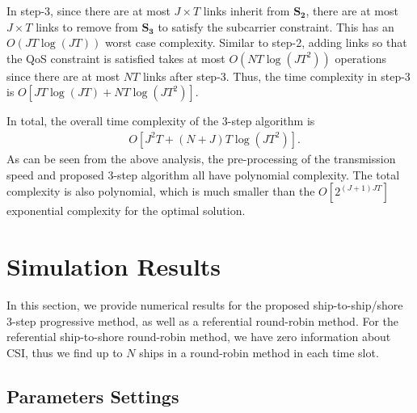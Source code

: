 \documentclass[conference]{IEEEtran}
\begin{document}
 In step-3, since there are at most $ J \times T$  links inherit from ${{\mathbf{S}}_{\mathbf{2}}}$, there are at most $J \times T$ links to remove from ${{\mathbf{S}}_{\mathbf{3}}}$ to satisfy the subcarrier constraint. This has an $O\left( JT\log \left( JT \right) \right)$ worst case complexity. Similar to step-2, adding links so that the QoS constraint is satisfied takes at most $O\left( NT\log \left( JT^2 \right) \right)$ operations since there are at most $NT$ links after step-3. Thus, the time complexity in step-3 is $O\left[ JT \log \left( JT \right) + NT \log \left( {JT^2} \right) \right]$.

 In total, the overall time complexity of the 3-step algorithm is 
 \begin{align}
  &  O\left[  J^2 T  + { \left({N+J}\right) T \log \left( JT^2 \right)} \right].
 \end{align}
 As can be seen from the above analysis, the pre-processing of the transmission speed and proposed 3-step algorithm all have polynomial complexity. The total complexity is also polynomial, which is much smaller than the $O\left[ 2^{\left( J+1 \right)JT} \right]$ exponential complexity for the optimal solution. 
 
 \section{Simulation Results}\label{sec:4}
 
 In this section, we provide numerical results for the proposed ship-to-ship/shore 3-step progressive method, as well as a referential round-robin method. 
 For the referential ship-to-shore round-robin method, we have zero information about CSI, thus we find up to $N$ ships in a round-robin method in each time slot. 
 
 \subsection{Parameters Settings}
 
 
 
\end{document}
